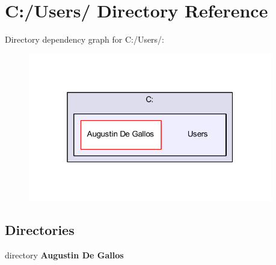 \section{C\-:/\-Users/ Directory Reference}
\label{dir_8ceffd4ee35c3518d4e8bdc7e638efe8}
Directory dependency graph for C\-:/\-Users/\-:\nopagebreak
\begin{figure}[H]
\begin{center}
\leavevmode
\includegraphics[width=302pt]{dir_8ceffd4ee35c3518d4e8bdc7e638efe8_dep}
\end{center}
\end{figure}
\subsection*{Directories}
\begin{DoxyCompactItemize}
\item 
directory {\bf Augustin De Gallos}
\end{DoxyCompactItemize}
